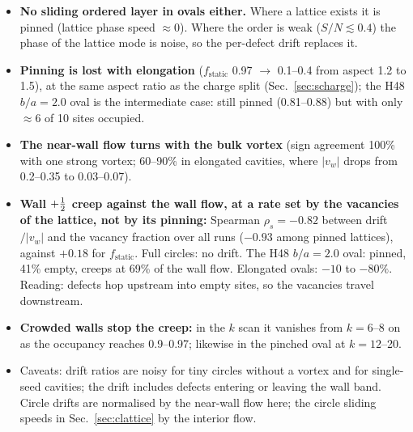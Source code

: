 \begin{itemize}
  \item \textbf{No sliding ordered layer in ovals either.} Where a lattice exists it is pinned (lattice phase speed $\approx0$). Where the
        order is weak ($S/N\lesssim0.4$) the phase of the lattice mode is noise, so the per-defect drift replaces it.
  \item \textbf{Pinning is lost with elongation} ($f_\mathrm{static}$ 0.97 $\to$ 0.1--0.4 from aspect 1.2 to 1.5), at the same aspect
        ratio as the charge split (Sec.~\ref{sec:scharge}); the H48 $b/a=2.0$ oval is the intermediate case: still pinned (0.81--0.88) but
        with only $\approx6$ of 10 sites occupied.
  \item \textbf{The near-wall flow turns with the bulk vortex} (sign agreement 100\% with one strong vortex; 60--90\% in elongated
        cavities, where $|v_w|$ drops from 0.2--0.35 to 0.03--0.07).
  \item \textbf{Wall $+\tfrac12$ creep against the wall flow, at a rate set by the vacancies of the lattice, not by its pinning:} Spearman
        $\rho_s=-0.82$ between drift$/|v_w|$ and the vacancy fraction over all runs ($-0.93$ among pinned lattices), against $+0.18$ for
        $f_\mathrm{static}$. Full circles: no drift. The H48 $b/a=2.0$ oval: pinned, 41\% empty, creeps at 69\% of the wall flow.
        Elongated ovals: $-10$ to $-80\%$. Reading: defects hop upstream into empty sites, so the vacancies travel downstream.
  \item \textbf{Crowded walls stop the creep:} in the $k$ scan it vanishes from $k=6$--8 on as the occupancy reaches 0.9--0.97;
        likewise in the pinched oval at $k=12$--20.
  \item Caveats: drift ratios are noisy for tiny circles without a vortex and for single-seed cavities; the drift includes defects
        entering or leaving the wall band. Circle drifts are normalised by the near-wall flow here; the circle sliding speeds in
        Sec.~\ref{sec:clattice} by the interior flow.
\end{itemize}

